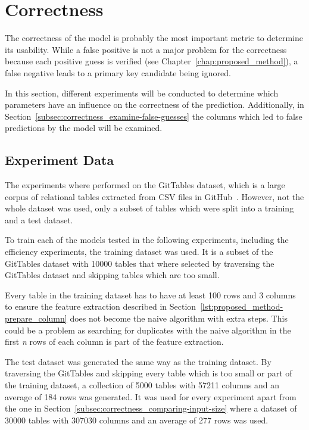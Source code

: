 \section{Correctness}\label{sec:correctness}
The correctness of the model is probably the most important metric to determine its usability. While a false positive is not a major problem for the correctness because each positive guess is verified (see Chapter~\ref{chap:proposed_method}), a false negative leads to a primary key candidate being ignored.

In this section, different experiments will be conducted to determine which parameters have an influence on the correctness of the prediction. Additionally, in Section~\ref{subsec:correctness_examine-false-guesses} the columns which led to false predictions by the model will be examined.


\subsection{Experiment Data}\label{subsec:correctness_experiment-data}
The experiments where performed on the GitTables dataset, which is a large corpus of relational tables extracted from CSV files in GitHub~\cite{gittables-article}. However, not the whole dataset was used, only a subset of tables which were split into a training and a test dataset.

To train each of the models tested in the following experiments, including the efficiency experiments, the training dataset was used. It is a subset of the GitTables dataset with \num{10000} tables that where selected by traversing the GitTables dataset and skipping tables which are too small.

Every table in the training dataset has to have at least \num{100} rows and \num{3} columns to ensure the feature extraction described in Section~\ref{lst:proposed_method-prepare_column} does not become the naive algorithm with extra steps. This could be a problem as searching for duplicates with the naive algorithm in the first \textit{n} rows of each column is part of the feature extraction.

The test dataset was generated the same way as the training dataset. By traversing the GitTables and skipping every table which is too small or part of the training dataset, a collection of \num{5000} tables with \num{57211} columns and an average of \num{184} rows was generated. It was used for every experiment apart from the one in Section~\ref{subsec:correctness_comparing-input-size} where a dataset of \num{30000} tables with \num{307030} columns and an average of \num{277} rows was used.


